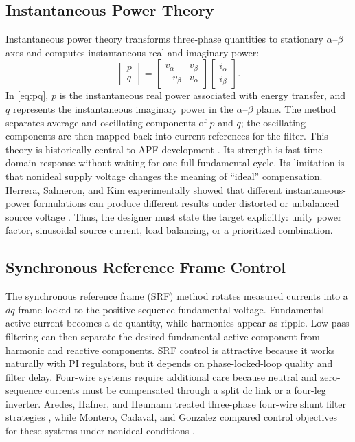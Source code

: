 \documentclass[conference]{IEEEtran}
\begin{document}
\subsection{Instantaneous Power Theory}
Instantaneous power theory transforms three-phase quantities to stationary $\alpha$--$\beta$ axes and computes instantaneous real and imaginary power:
\begin{equation}
\begin{bmatrix}p\\q\end{bmatrix} =
\begin{bmatrix}v_{\alpha} & v_{\beta}\\ -v_{\beta} & v_{\alpha}\end{bmatrix}
\begin{bmatrix}i_{\alpha}\\i_{\beta}\end{bmatrix}.
\label{eq:pq}
\end{equation}
In \eqref{eq:pq}, $p$ is the instantaneous real power associated with energy transfer, and $q$ represents the instantaneous imaginary power in the $\alpha$--$\beta$ plane. The method separates average and oscillating components of $p$ and $q$; the oscillating components are then mapped back into current references for the filter. This theory is historically central to APF development \cite{Akagi1984,AkagiBook2007}. Its strength is fast time-domain response without waiting for one full fundamental cycle. Its limitation is that nonideal supply voltage changes the meaning of ``ideal'' compensation. Herrera, Salmeron, and Kim experimentally showed that different instantaneous-power formulations can produce different results under distorted or unbalanced source voltage \cite{Herrera2008}. Thus, the designer must state the target explicitly: unity power factor, sinusoidal source current, load balancing, or a prioritized combination.

\subsection{Synchronous Reference Frame Control}
The synchronous reference frame (SRF) method rotates measured currents into a $dq$ frame locked to the positive-sequence fundamental voltage. Fundamental active current becomes a dc quantity, while harmonics appear as ripple. Low-pass filtering can then separate the desired fundamental active component from harmonic and reactive components. SRF control is attractive because it works naturally with PI regulators, but it depends on phase-locked-loop quality and filter delay. Four-wire systems require additional care because neutral and zero-sequence currents must be compensated through a split dc link or a four-leg inverter. Aredes, Hafner, and Heumann treated three-phase four-wire shunt filter strategies \cite{Aredes1997}, while Montero, Cadaval, and Gonzalez compared control objectives for these systems under nonideal conditions \cite{Montero2007}.
\end{document}
